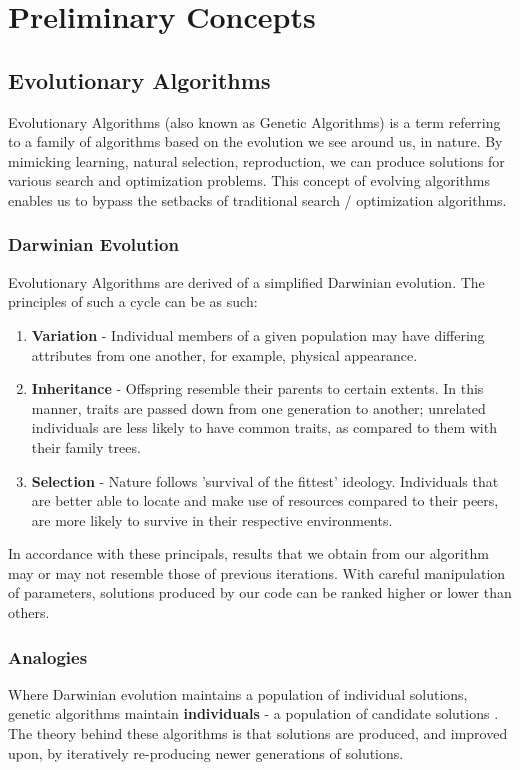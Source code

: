 \documentclass[conference,compsoc]{IEEEtran}
\begin{document}
\section{Preliminary Concepts}
\subsection{Evolutionary Algorithms}
Evolutionary Algorithms (also known as Genetic Algorithms) is a term referring to a 
family of algorithms based on the evolution we see around us, in nature. By mimicking learning, 
natural selection, reproduction, we can produce solutions for various search and optimization problems. 
This concept of evolving algorithms enables us to bypass the setbacks of traditional search / optimization algorithms.

\subsubsection{Darwinian Evolution}
Evolutionary Algorithms are derived of a simplified Darwinian evolution. The principles of such a cycle can be as such:
\begin{enumerate}
    \item \textbf{Variation} - Individual members of a given population may have differing attributes 
    from one another, for example, physical appearance.
    \item \textbf{Inheritance} - Offspring resemble their parents to certain extents. 
    In this manner, traits are passed down from one generation to another; unrelated individuals are less likely to have common traits, as 
    compared to them with their family trees.
    \item \textbf{Selection} - Nature follows 'survival of the fittest' ideology. Individuals that 
    are better able to locate and make use of resources compared to their peers, are more likely to survive in their respective environments. 
\end{enumerate}
In accordance with these principals, results that we obtain from our algorithm may or may not resemble those of 
previous iterations. With careful manipulation of parameters, solutions produced by our code can be ranked 
higher or lower than others.
\subsubsection{Analogies}
Where Darwinian evolution maintains a population of individual solutions, genetic algorithms maintain 
\textbf{individuals} - a population of candidate solutions \cite{Wiransky-GA}. The theory behind these 
algorithms is that solutions are produced, and improved upon, by iteratively re-producing newer generations of solutions.
\end{document}
